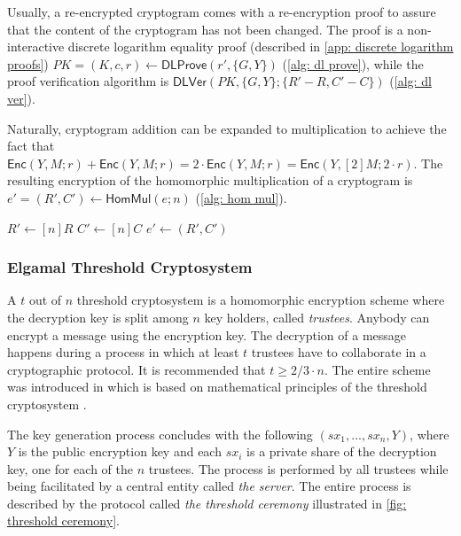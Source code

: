 Usually, a re-encrypted cryptogram comes with a re-encryption proof to assure that the content of the cryptogram has not been changed. The proof is a non-interactive discrete logarithm equality proof (described in \cref{app: discrete logarithm proofs}) $PK = (K, c, r) \gets \mathsf{DLProve} (r', \{ G, Y \})$ (\cref{alg: dl prove}), while the proof verification algorithm is $\mathsf{DLVer} (PK, \{ G, Y \}; \{ R'-R, C'-C \})$ (\cref{alg: dl ver}).

Naturally, cryptogram addition can be expanded to multiplication to achieve the fact that $\mathsf{Enc}(Y, M; r) + \mathsf{Enc}(Y, M; r) = 2 \cdot \mathsf{Enc}(Y, M; r) = \mathsf{Enc}(Y, [2]M; 2 \cdot r)$. The resulting encryption of the homomorphic multiplication of a cryptogram is $e' = (R', C') \gets \mathsf{HomMul}(e; n)$ (\cref{alg: hom mul}).

\begin{algorithm}[ht]
    \DontPrintSemicolon
    \caption{$\mathsf{HomMul} (e; n)$}
    
    $R' \gets [n]R$ \;
    $C' \gets [n]C$ \;
    $e' \gets (R', C')$ \;
     
    
    \label{alg: hom mul}
\end{algorithm}


\subsubsection{Elgamal Threshold Cryptosystem} \label{app: elgamal threshold cryptosystem}
A $t$ out of $n$ threshold cryptosystem is a homomorphic encryption scheme where the decryption key is split among $n$ key holders, called \textit{trustees}. Anybody can encrypt a message using the encryption key. The decryption of a message happens during a process in which at least $t$ trustees have to collaborate in a cryptographic protocol. It is recommended that $t \geq 2/3 \cdot n$. The entire scheme was introduced in \cite{Pedersen91} which is based on mathematical principles of the threshold cryptosystem \cite{Desmedt89, Shamir79}.

The key generation process concludes with the following $(sx_1, ..., sx_n, Y)$, where $Y$ is the public encryption key and each $sx_i$ is a private share of the decryption key, one for each of the $n$ trustees. The process is performed by all trustees while being facilitated by a central entity called \textit{the server}. The entire process is described by the protocol called \textit{the threshold ceremony} illustrated in \cref{fig: threshold ceremony}.

